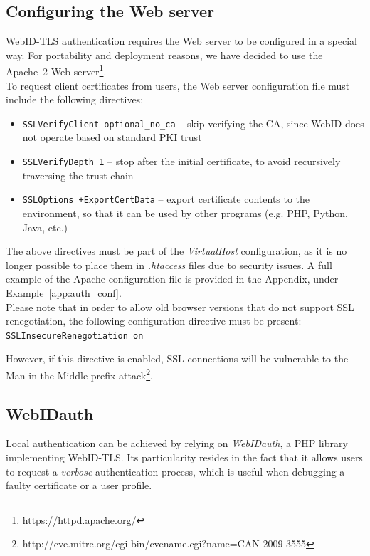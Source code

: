 \subsection{Configuring the Web server}
WebID-TLS authentication requires the Web server to be configured in a special way. For portability and deployment reasons, we have decided to use the Apache~2 Web server\footnote{https://httpd.apache.org/}.\\

To request client certificates from users, the Web server configuration file must include the following directives:
\begin{itemize}
\item \verb+SSLVerifyClient optional_no_ca+ -- skip verifying the CA, since WebID does not operate based on standard PKI trust
\item \verb+SSLVerifyDepth 1+ -- stop after the initial certificate, to avoid recursively traversing the trust chain
\item \verb!SSLOptions +ExportCertData! -- export certificate contents to the environment, so that it can be used by other programs (e.g. PHP, Python, Java, etc.)
\end{itemize}

The above directives must be part of the \textit{VirtualHost} configuration, as it is no longer possible to place them in \textit{.htaccess} files due to security issues. A full example of the Apache configuration file is provided in the Appendix, under Example~\ref{app:auth_conf}.\\

Please note that in order to allow old browser versions that do not support SSL renegotiation, the following configuration directive must be present:\\

\verb+SSLInsecureRenegotiation on+

However, if this directive is enabled, SSL connections will be vulnerable to the Man-in-the-Middle prefix attack\footnote{http://cve.mitre.org/cgi-bin/cvename.cgi?name=CAN-2009-3555}.

\subsection{WebIDauth}
Local authentication can be achieved by relying on \textit{WebIDauth}, a PHP library implementing WebID-TLS. Its particularity resides in the fact that it allows users to request a \textit{verbose} authentication process, which is useful when debugging a faulty certificate or a user profile.\\

